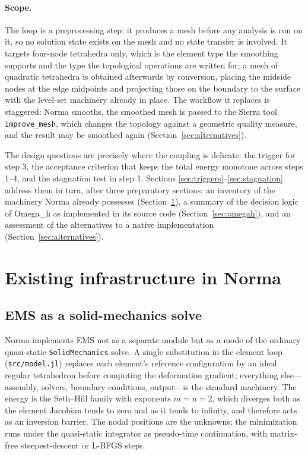 \documentclass[11pt]{article}
\newcommand{\code}[1]{\texttt{#1}}
\newcommand{\omegah}{Omega\_h}
\begin{document}
\paragraph{Scope.} The loop is a preprocessing step: it produces a mesh
before any analysis is run on it, so no solution state exists on the
mesh and no state transfer is involved. It targets four-node tetrahedra
only, which is the element type the smoothing supports and the type the
topological operations are written for; a mesh of quadratic tetrahedra
is obtained afterwards by conversion, placing the midside nodes at the
edge midpoints and projecting those on the boundary to the surface with
the level-set machinery already in place. The workflow it replaces is
staggered: Norma smooths, the smoothed mesh is passed to the Sierra tool
\code{improve\_mesh}, which changes the topology against a geometric
quality measure, and the result may be smoothed again
(Section~\ref{sec:alternatives}).

The design questions are precisely where the coupling is delicate: the
trigger for step 3, the acceptance criterion that keeps the total energy
monotone across steps 1--4, and the stagnation test in step 1. Sections
\ref{sec:triggers}--\ref{sec:stagnation} address them in turn, after three
preparatory sections: an inventory of the machinery Norma already
possesses (Section~\ref{sec:norma}), a summary of the decision logic
of \omegah{} as implemented in its source code
(Section~\ref{sec:omegah}), and an assessment of the alternatives to a
native implementation (Section~\ref{sec:alternatives}).

\section{Existing infrastructure in Norma}
\label{sec:norma}

\subsection{EMS as a solid-mechanics solve}

Norma implements EMS not as a separate module but as a mode of the
ordinary quasi-static \code{SolidMechanics} solve. A single substitution
in the element loop (\code{src/model.jl}) replaces each element's
reference configuration by an ideal regular tetrahedron before computing
the deformation gradient; everything else---assembly, solvers, boundary
conditions, output---is the standard machinery. The energy is the
Seth--Hill family with exponents $m=n=2$, which diverges both as the
element Jacobian tends to zero and as it tends to infinity, and therefore
acts as an inversion barrier. The nodal positions are the unknowns; the
minimization runs under the quasi-static integrator as pseudo-time
continuation, with matrix-free steepest-descent or L-BFGS steps.
\end{document}
